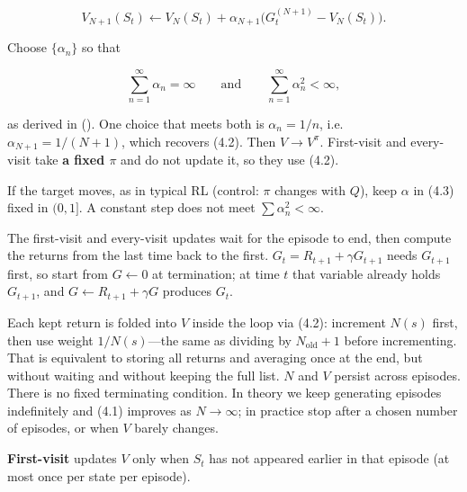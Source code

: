 \[
V_{N+1}(S_t)
\leftarrow
V_N(S_t) + \alpha_{N+1} \bigl( G_t^{(N+1)} - V_N(S_t) \bigr).
\]

Choose $\{\alpha_n\}$ so that

\[
\sum_{n=1}^{\infty}\alpha_n=\infty
\qquad\text{and}\qquad
\sum_{n=1}^{\infty}\alpha_n^2<\infty,
\]

as derived in  (). One choice that meets both is $\alpha_n=1/n$, i.e.\ $\alpha_{N+1}=1/(N{+}1)$, which recovers (4.2). Then $V\to V^\pi$. First-visit and every-visit take \textbf{a fixed $\pi$} and do not update it, so they use (4.2).

If the target moves, as in typical RL (control: $\pi$ changes with $Q$), keep $\alpha$ in (4.3) fixed in $(0,1]$. A constant step does not meet $\sum\alpha_n^2<\infty$.

The first-visit and every-visit updates wait for the episode to end, then compute the returns from the last time back to the first. $G_t=R_{t+1}+\gamma G_{t+1}$ needs $G_{t+1}$ first, so start from $G\leftarrow 0$ at termination; at time $t$ that variable already holds $G_{t+1}$, and $G\leftarrow R_{t+1}+\gamma G$ produces $G_t$.

Each kept return is folded into $V$ inside the loop via (4.2): increment $N(s)$ first, then use weight $1/N(s)$---the same as dividing by $N_{\text{old}}+1$ before incrementing. That is equivalent to storing all returns and averaging once at the end, but without waiting and without keeping the full list. $N$ and $V$ persist across episodes. There is no fixed terminating condition. In theory we keep generating episodes indefinitely and (4.1) improves as $N\to\infty$; in practice stop after a chosen number of episodes, or when $V$ barely changes.

\textbf{First-visit} updates $V$ only when $S_t$ has not appeared earlier in that episode (at most once per state per episode).

